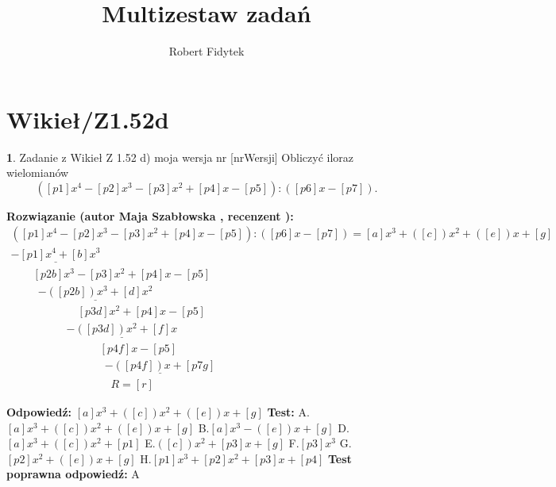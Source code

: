 \documentclass[12pt, a4paper]{article}
\title{Multizestaw zadań}
\author{Robert Fidytek}
\date{}
\theoremstyle{definition} %
\newtheorem{zad}{}
\newcommand{\kategoria}[1]{\section{#1}} %
\newcommand{\zadStart}[1]{\begin{zad}#1\newline} %
\newcommand{\zadStop}{\end{zad}}   %
\newcommand{\rozwStart}[2]{\noindent \textbf{Rozwiązanie (autor #1 , recenzent #2): }\newline} %
\newcommand{\rozwStop}{\newline}                                            %
\newcommand{\odpStart}{\noindent \textbf{Odpowiedź:}\newline}    %
\newcommand{\odpStop}{\newline}                                             %
\newcommand{\testStart}{\noindent \textbf{Test:}\newline} %
\newcommand{\testStop}{\newline} %
\newcommand{\kluczStart}{\noindent \textbf{Test poprawna odpowiedź:}\newline} %
\newcommand{\kluczStop}{\newline} %
\begin{document}
\maketitle


\kategoria{Wikieł/Z1.52d}
\zadStart{Zadanie z Wikieł Z 1.52 d)  moja wersja nr [nrWersji]}
Obliczyć iloraz wielomianów $$([p1]x^{4}-[p2]x^{3}-[p3]x^{2}+[p4]x-[p5]):([p6]x-[p7]).$$

\zadStop

\rozwStart{Maja Szabłowska}{}
$$\begin{array}{lll}
([p1]x^{4}-[p2]x^{3}-[p3]x^{2}+[p4]x-[p5]):([p6]x-[p7])  =  [a]x^3 +([c])x^2 + ([e])x +[g] \\
\underline{-[p1]x^4 + [b]x^3} & &  \\
\qquad [p2b]x^3  -[p3]x^2 +[p4]x -[p5] & & \\
\qquad \ \ \underline{-([p2b])x^3 +[d]x^2} & &\\
\qquad \qquad \qquad [p3d]x^2 + [p4]x - [p5] & & \\
\qquad \qquad \quad \underline{-([p3d])x^2 + [f]x}  & & \\
\qquad \qquad \qquad \qquad [p4f]x - [p5] & & \\
\qquad \qquad \qquad \qquad \ \ \underline{-([p4f])x + [p7g]} & & \\
\qquad \qquad \qquad \qquad \quad R = [r] & &
\end{array}$$
\rozwStop


\odpStart
$[a]x^3 +([c])x^2 + ([e])x +[g]$
\odpStop
\testStart
A.$[a]x^3 +([c])x^2 + ([e])x +[g]$
B.$[a]x^3 - ([e])x +[g]$
D.$[a]x^3 +([c])x^2 +[p1]$
E.$([c])x^2 + [p3]x +[g]$
F.$[p3]x^3 $
G.$[p2]x^2 + ([e])x +[g]$
H.$[p1]x^3 +[p2]x^2 + [p3]x +[p4]$
\testStop
\kluczStart
A
\kluczStop
\end{document}
